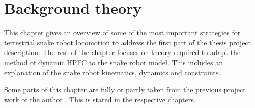 \chapter{Background theory}\label{chapter:theory}

This chapter gives an overview of some of the most important strategies for terrestrial snake robot locomotion to address the first part of the thesis project description. The rest of the chapter focuses on theory required to adapt the method of dynamic HPFC to the snake robot model. This includes an explanation of the snake robot kinematics, dynamics and constraints.


Some parts of this chapter are fully or partly taken from the previous project work of the author \cite{AtussaProsjektoppgp}. This is stated in the respective chapters.








%







